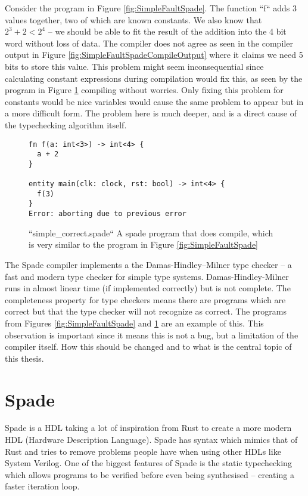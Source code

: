 \documentclass[msc,lith,english]{liuthesis}
\begin{document}
Consider the program in Figure \ref{fig:SimpleFaultSpade}. The function ``f`` adds 3 values together, two of which are known constants. We also know that $2^3 + 2 < 2^4$ -- we should be able to fit the result of the addition into the 4 bit word without loss of data. The compiler does not agree as seen in the compiler output in Figure \ref{fig:SimpleFaultSpadeCompileOutput} where it claims we need 5 bits to store this value. This problem might seem inconsequential since calculating constant expressions during compilation would fix this, as seen by the program in Figure \ref{fig:SimpleCorrectSpade} compiling without worries. Only fixing this problem for constants would be nice variables would cause the same problem to appear but in a more difficult form. The problem here is much deeper, and is a direct cause of the typechecking algorithm itself.

\begin{figure}[h]
\begin{center}
\begin{verbatim}
fn f(a: int<3>) -> int<4> {
  a + 2
}

entity main(clk: clock, rst: bool) -> int<4> {
  f(3)
}
Error: aborting due to previous error
\end{verbatim}
\end{center}
\label{fig:SimpleCorrectSpade}
\caption{``simple\_correct.spade`` A spade program that does compile, which is very similar to the program in Figure \ref{fig:SimpleFaultSpade}}
\end{figure}

The Spade compiler implements a the Damas-Hindley–Milner type checker -- a fast and modern type checker for simple type systems. Damas-Hindley-Milner runs in almost linear time (if implemented correctly) but is not complete. The completeness property for type checkers means there are programs which are correct but that the type checker will not recognize as correct. The programs from Figures \ref{fig:SimpleFaultSpade} and \ref{fig:SimpleCorrectSpade} are an example of this. This observation is important since it means this is not a bug, but a limitation of the compiler itself. How this should be changed and to what is the central topic of this thesis.

\section{Spade}
Spade is a HDL taking a lot of inspiration from Rust to create a more modern HDL (Hardware Description Language). Spade has syntax which mimics that of Rust and tries to remove problems people have when using other HDLs like System Verilog. One of the biggest features of Spade is the static typechecking which allows programs to be verified before even being synthesised -- creating a faster iteration loop.
\cite{src:spadeSomething} \cite{src:spadeAnHDL}
\end{document}

